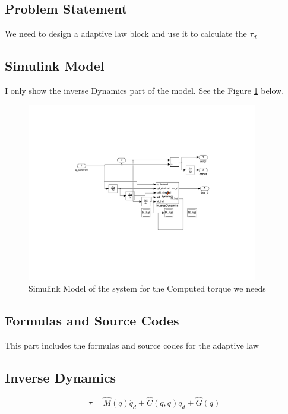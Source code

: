 \documentclass{article}
\begin{document}
\subsection*{Problem Statement}

We need to design a adaptive law block and use it to calculate the $\tau_d$\\

\subsection{Simulink Model}

I only show the inverse Dynamics part of the model.
See the Figure \ref{fig:model_inverseDynamics} below.
\begin{figure}[ht]
    \centering
    \includegraphics[width=0.9\textwidth]{figures/model_inverseDynamics.pdf}
    \caption{Simulink Model of the system for the Computed torque we needs}
    \label{fig:model_inverseDynamics}
\end{figure}

\subsection{Formulas and Source Codes}
This part includes the formulas and source codes for the adaptive law
\subsection*{Inverse Dynamics}
    \begin{equation}
        \tau=\hat{M}(q) \ddot{q}_d+\hat{C}(q, \dot{q}) \dot{q}_d+\hat{G}(q)
    \end{equation}
\end{document}
